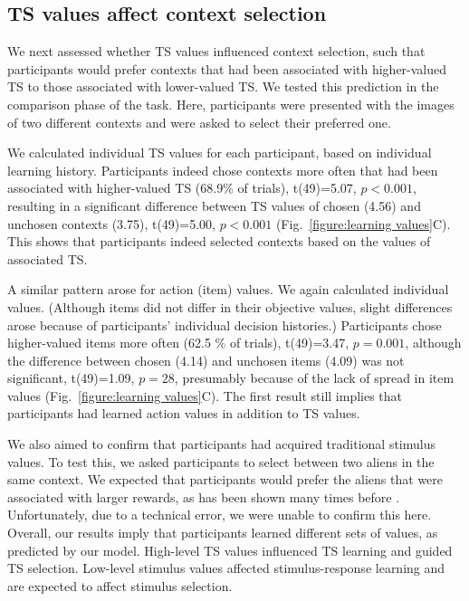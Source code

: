 \documentclass[10pt, letterpaper]{article}
\begin{document}
\subsection{TS values affect context selection}

We next assessed whether TS values influenced context selection, such that participants would prefer contexts that had been associated with higher-valued TS to those associated with lower-valued TS. We tested this prediction in the comparison phase of the task. Here, participants were presented with the images of two different contexts and were asked to select their preferred one. 

We calculated individual TS values for each participant, based on individual learning history. Participants indeed chose contexts more often that had been associated with higher-valued TS (68.9\% of trials), t(49)=5.07, $p<0.001$, resulting in a significant difference between TS values of chosen (4.56) and unchosen contexts (3.75), t(49)=5.00, $p<0.001$ (Fig.~\ref{figure:learning values}C). This shows that participants indeed selected contexts based on the values of associated TS.

A similar pattern arose for action (item) values. We again calculated individual values. (Although items did not differ in their objective values, slight differences arose because of participants' individual decision histories.) Participants chose higher-valued items more often (62.5 \% of trials), t(49)=3.47, $p=0.001$, although the difference between chosen (4.14) and unchosen items (4.09) was not significant, t(49)=1.09, $p=28$, presumably because of the lack of spread in item values (Fig.~\ref{figure:learning values}C). The first result still implies that participants had learned action values in addition to TS values.

We also aimed to confirm that participants had acquired traditional stimulus values. To test this, we asked participants to select between two aliens in the same context. We expected that participants would prefer the aliens that were associated with larger rewards, as has been shown many times before \cite{frank_by_2004}. Unfortunately, due to a technical error, we were unable to confirm this here. Overall, our results imply that participants learned different sets of values, as predicted by our model. High-level TS values influenced TS learning and guided TS selection. Low-level stimulus values affected stimulus-response learning and are expected to affect stimulus selection.
\end{document}
